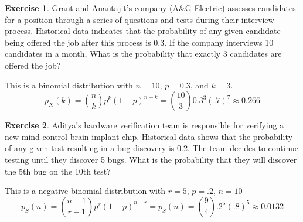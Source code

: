 \documentclass[12pt]{amsart}
\theoremstyle{definition}
\newtheorem{exercise}{Exercise}
\numberwithin{equation}{section}
\theoremstyle{plain}
\begin{document}
 

\begin{exercise}
    Grant and Anantajit's company (A\&G Electric) assesses candidates for a position through a series of questions and tests during their interview process. Historical data indicates that the probability of any given candidate being offered the job after this process is 0.3. If the company interviews 10 candidates in a month, What is the probability that exactly 3 candidates are offered the job?%
    \begin{answer}
    This is a binomial distribution with $n = 10$, $p = 0.3$, and $k = 3$.
    $$ p_X(k) = {n\choose k}p^k(1-p)^{n-k} = {10\choose 3}0.3^3(.7)^7 \approx 0.266$$
    \end{answer}
\end{exercise}

 

\begin{exercise}
    Aditya's hardware verification team is responsible for verifying a new mind control brain implant chip. Historical data shows that the probability of any given test resulting in a bug discovery is 0.2. The team decides to continue testing until they discover 5 bugs. What is the probability that they will discover the 5th bug on the 10th test?%
    \begin{answer}
    This is a negative binomial distribution with $r = 5$, $p = .2$, $n=10$
    $$ p_S(n) = {n - 1\choose r - 1}p^r(1-p)^{n-r} = p_S(n) = {9\choose 4}.2^5(.8)^{5}\approx 0.0132$$
    
    \end{answer}
\end{exercise}

 
\end{document}
